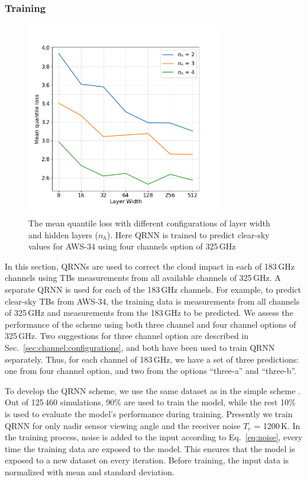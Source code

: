 \documentclass[12pt]{article}
\begin{document}
\subsubsection{Training}
%  
\label{sec:qrnn:training}
\begin{figure}[!tb]
	\centering
	\includegraphics[height=85mm]{quantile_loss.png}
	\caption{The mean quantile loss with different configurations of layer width and hidden layers ($n_h$). Here QRNN is trained to predict clear-sky values for AWS-34 using four channels option of 325\,GHz}
	\label{fig:quantile_loss}
\end{figure}
In this section, QRNNs are used to correct the cloud impact in each of 183\,GHz
channels using TBs measurements from all available channels of 325\,GHz. A
separate QRNN is used for each of the 183\,GHz channels. For example, to
predict clear-sky TBs from AWS-34, the training data is measurements from all
channels of 325\,GHz and measurements from the 183\,GHz to be predicted. We
assess the performance of the scheme using both three channel and four channel
options of 325\,GHz. Two suggestions for three channel option are described in
Sec.~\ref{sec:channel:configurations}, and both have been used to train QRNN
separately. Thus, for each channel of 183\,GHz, we have a set of three
predictions: one from four channel option, and two from the options ``three-a'' and ``three-b''.

To develop the QRNN scheme, we use the same dataset as in the
simple scheme . Out of 125\,460 simulations, 90\% are used to train the model,
while the rest 10\% is used to evaluate the model's performance during
training. Presently we train QRNN for only nadir sensor viewing angle and the
receiver noise $T_r$ = 1200\,K. In the training process, noise is added to the
input according to Eq.~\ref{eq:noise}, every time the training data are exposed
to the model. This ensures that the model is exposed to a new dataset on every
iteration. Before training, the input data is normalized with mean and standard
deviation.
\end{document}
